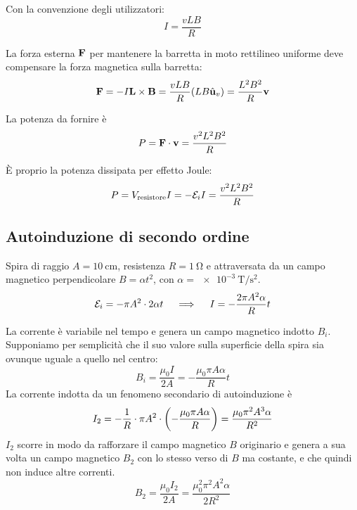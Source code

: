 Con la convenzione degli utilizzatori:
\begin{equation}
    I = \frac{v L B}{R}
\end{equation}

La forza esterna $\mathbf{F}$ per mantenere la barretta in moto rettilineo uniforme deve compensare la forza magnetica sulla barretta:
\begin{equation}
    \mathbf{F} = - I \mathbf{L} \times \mathbf{B}
    = \frac{vLB}{R} (L B \hat{\mathbf{u}}_{v})
    = \frac{L^2 B^2}{R} \mathbf{v}
\end{equation}

La potenza da fornire è
\begin{equation}
    P = \mathbf{F} \cdot \mathbf{v} = \frac{v^2 L^2 B^2}{R}
\end{equation}

È proprio la potenza dissipata per effetto Joule:
\begin{equation}
    P = V_\text{resistore} I = - \mathcal{E}_i I = \frac{v^2 L^2 B^2}{R}
\end{equation}

\subsection{Autoinduzione di secondo ordine}

Spira di raggio $A = \qty{10}{\centi\metre}$, resistenza $R = \qty{1}{\ohm}$ e attraversata da un campo magnetico perpendicolare $B = \alpha t^2$, con $\alpha = \qty{e-3}{\tesla\per\second\squared}$.
\begin{equation}
    \mathcal{E}_i = - \pi A^2 \cdot 2 \alpha t
    \quad \implies \quad
    I = - \frac{2\pi A^2 \alpha}{R} t
\end{equation}

La corrente è variabile nel tempo e genera un campo magnetico indotto $B_i$.
Supponiamo per semplicità che il suo valore sulla superficie della spira sia ovunque uguale a quello nel centro:
\begin{equation}
    B_i = \frac{\mu_0 I}{2A} = - \frac{\mu_0 \pi A \alpha}{R}t
\end{equation}
La corrente indotta da un fenomeno secondario di autoinduzione è
\begin{equation}
    I_2 = -\frac{1}{R} \cdot \pi A^2 \cdot \left( - \frac{\mu_0 \pi A \alpha}{R} \right)
    = \frac{\mu_0 \pi^2 A^3 \alpha}{R^2}
\end{equation}
$I_2$ scorre in modo da rafforzare il campo magnetico $B$ originario e genera a sua volta un campo magnetico $B_2$ con lo stesso verso di $B$ ma costante, e che quindi non induce altre correnti.
\begin{equation}
    B_2 = \frac{\mu_0 I_2}{2 A} = \frac{\mu_0^2 \pi^2 A^2 \alpha}{2 R^2}
\end{equation}

